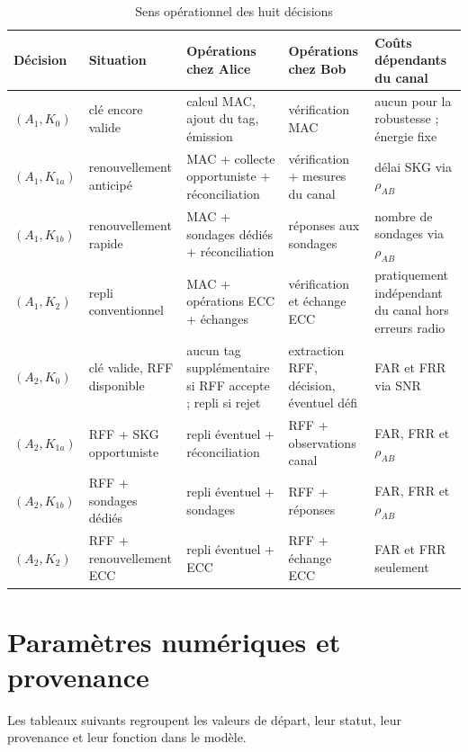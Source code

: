 \documentclass[conference,a4paper]{IEEEtran}
\begin{document}
\begin{table}[H]
\caption{Sens opérationnel des huit décisions}
\label{tab:eight-decisions}
\centering\footnotesize
\begin{tabularx}{\textwidth}{@{}l l Y Y Y@{}}
\toprule
Décision & Situation & Opérations chez Alice & Opérations chez Bob & Coûts dépendants du canal \\
\midrule
$(A_1,K_0)$ & clé encore valide & calcul MAC, ajout du tag, émission & vérification MAC & aucun pour la robustesse ; énergie fixe \\
$(A_1,K_{1a})$ & renouvellement anticipé & MAC + collecte opportuniste + réconciliation & vérification + mesures du canal & délai SKG via $\rho_{AB}$ \\
$(A_1,K_{1b})$ & renouvellement rapide & MAC + sondages dédiés + réconciliation & réponses aux sondages & nombre de sondages via $\rho_{AB}$ \\
$(A_1,K_2)$ & repli conventionnel & MAC + opérations ECC + échanges & vérification et échange ECC & pratiquement indépendant du canal hors erreurs radio \\
$(A_2,K_0)$ & clé valide, RFF disponible & aucun tag supplémentaire si RFF accepte ; repli si rejet & extraction RFF, décision, éventuel défi & FAR et FRR via SNR \\
$(A_2,K_{1a})$ & RFF + SKG opportuniste & repli éventuel + réconciliation & RFF + observations canal & FAR, FRR et $\rho_{AB}$ \\
$(A_2,K_{1b})$ & RFF + sondages dédiés & repli éventuel + sondages & RFF + réponses & FAR, FRR et $\rho_{AB}$ \\
$(A_2,K_2)$ & RFF + renouvellement ECC & repli éventuel + ECC & RFF + échange ECC & FAR et FRR seulement \\
\bottomrule
\end{tabularx}
\end{table}

\section{Paramètres numériques et provenance}
\label{ann:parametres}
Les tableaux suivants regroupent les valeurs de départ, leur statut, leur provenance et leur fonction dans le modèle.
\end{document}
